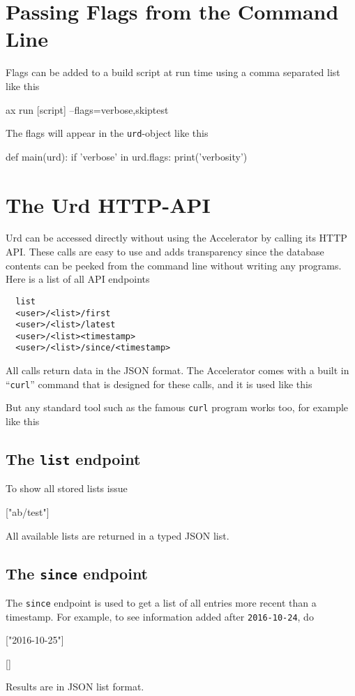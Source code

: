 \section{Passing Flags from the Command Line}
Flags can be added to a build script at run time using a comma
separated list like this
\begin{python}
ax run [script] --flags=verbose,skiptest
\end{python}
The flags will appear in the \texttt{urd}-object like this
\begin{python}
def main(urd):
    if 'verbose' in urd.flags:
       print('verbosity')
\end{python}





\section{The Urd HTTP-API}
Urd can be accessed directly without using the Accelerator by calling
its HTTP API.  These calls are easy to use and adds transparency since
the database contents can be peeked from the command line without
writing any programs.  Here is a list of all API endpoints
\begin{verbatim}
  list
  <user>/<list>/first
  <user>/<list>/latest
  <user>/<list><timestamp>
  <user>/<list>/since/<timestamp>
\end{verbatim}
All calls return data in the JSON format.  The Accelerator comes with
a built in ``\texttt{curl}'' command that is designed for these calls,
and it is used like this
\begin{shell}
\end{shell}
But any standard tool such as the famous \texttt{curl} program works
too, for example like this
\begin{shell}
\end{shell}



\subsection{The \texttt{list} endpoint}
To show all stored lists issue
\begin{shell}
["ab/test"]
\end{shell}
All available lists are returned in a typed JSON list.



\subsection{The \texttt{since} endpoint}
The \texttt{since} endpoint is used to get a list of all entries more
recent than a timestamp.  For example, to see information added
after \texttt{2016-10-24}, do
\begin{shell}
["2016-10-25"]
\end{shell}
\begin{shell}
[]
\end{shell}
Results are in JSON list format.



